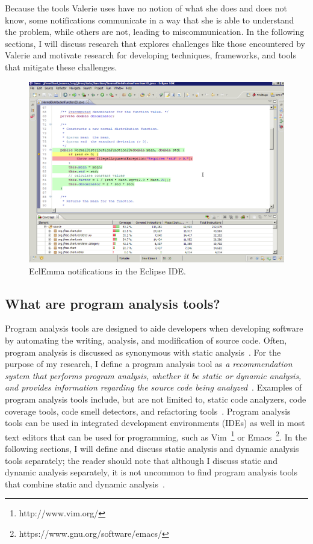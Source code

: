 \documentclass{llncs}
\begin{document}
Because the tools Valerie uses have no notion of what she does and does not know, some notifications communicate in a way that she is able to understand the problem, while others are not, leading to  miscommunication. In the following sections, I will discuss research that explores challenges like those encountered by Valerie and motivate research for developing techniques, frameworks, and tools that mitigate these challenges.

\begin{figure} [ht]
	\centering
	\includegraphics[width=\textwidth]{figs/eclemma.png}
	\caption{EclEmma notifications in the Eclipse IDE.}
	\label{fig:ecl}
\end{figure}

\subsection{What are program analysis tools?}
Program analysis tools are designed to aide developers when developing software by automating the writing, analysis, and modification of source code.
Often, program analysis is discussed as synonymous with static analysis~\cite{nielson2015principles}. 
For the purpose of my research, I define a program analysis tool as \emph{a recommendation system that performs program analysis, whether it be static or dynamic analysis, and provides information regarding the source code being analyzed}~\cite{robillard2014recommendation}.
Examples of program analysis tools include, but are not limited to, static code analyzers, code coverage tools, code smell detectors, and refactoring tools~\cite{adolph2011using,Murphy-Hill:2010:Ambient,ge2012reconciling}.
Program analysis tools can be used in integrated development environments (IDEs) as well in most text editors that can be used for programming, such as Vim~\footnote{http://www.vim.org/} or Emacs~\footnote{https://www.gnu.org/software/emacs/}. 
In the following sections, I will define and discuss static analysis and dynamic analysis tools separately; the reader should note that although I discuss static and dynamic analysis separately, it is not uncommon to find program analysis tools that combine static and dynamic analysis~\cite{ernst2003static}.                                                
\end{document}
